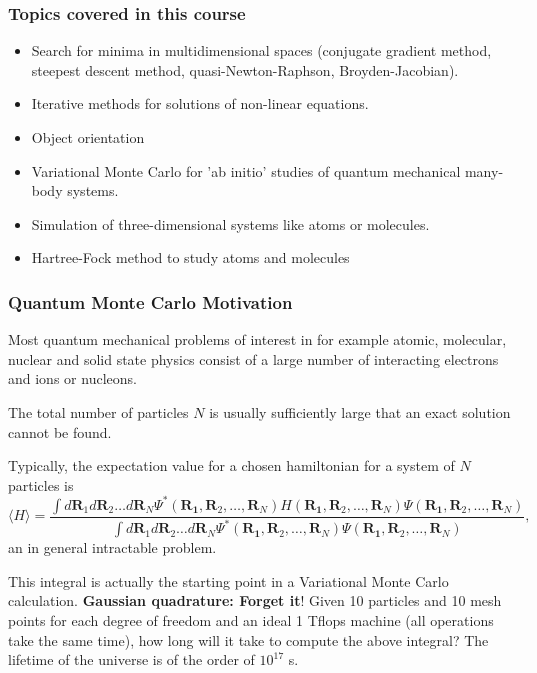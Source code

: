 \documentclass{beamer}
\begin{document}
\begin{frame}
\frametitle{Topics covered in this course}

\begin{block}{}
\begin{itemize}
  \item Search for minima in multidimensional spaces (conjugate gradient method, steepest descent method, quasi-Newton-Raphson, Broyden-Jacobian).

  \item Iterative methods for solutions of non-linear equations.

  \item Object orientation

  \item Variational Monte Carlo for 'ab initio' studies of quantum mechanical many-body systems.

  \item Simulation of three-dimensional systems like atoms or molecules.

  \item Hartree-Fock method to study atoms and molecules
\end{itemize}

\noindent
\end{block}
\end{frame}

\begin{frame}
\frametitle{Quantum Monte Carlo Motivation}

\begin{block}{}
Most quantum mechanical  problems of interest in for example atomic, molecular, nuclear and solid state 
physics consist of a large number of interacting electrons and ions or nucleons. 

The total number of particles $N$ is usually sufficiently large
that an exact solution cannot be found. 

Typically, 
the expectation value for a chosen hamiltonian for a system of  $N$ particles is
\[
   \langle H \rangle =
   \frac{\int d\bm{R}_1d\bm{R}_2\dots d\bm{R}_N
         \Psi^{\ast}(\bm{R_1},\bm{R}_2,\dots,\bm{R}_N)
          H(\bm{R_1},\bm{R}_2,\dots,\bm{R}_N)
          \Psi(\bm{R_1},\bm{R}_2,\dots,\bm{R}_N)}
        {\int d\bm{R}_1d\bm{R}_2\dots d\bm{R}_N
        \Psi^{\ast}(\bm{R_1},\bm{R}_2,\dots,\bm{R}_N)
        \Psi(\bm{R_1},\bm{R}_2,\dots,\bm{R}_N)},
\]
an in general intractable problem.

 This integral is actually the starting point in a Variational Monte Carlo calculation. \textbf{Gaussian quadrature: Forget it}! Given 10 particles and 10 mesh points for each degree of freedom
and an
 ideal 1 Tflops machine (all operations take the same time), how long will it take to compute the above integral? The lifetime of the universe is of the order of $10^{17}$ s.
\end{block}
\end{frame}
\end{document}
